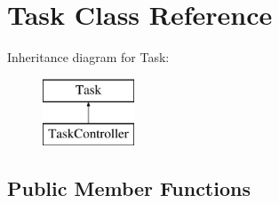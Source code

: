 \hypertarget{class_task}{\section{Task Class Reference}
\label{class_task}
}
Inheritance diagram for Task\-:\begin{figure}[H]
\begin{center}
\leavevmode
\includegraphics[height=2.000000cm]{class_task}
\end{center}
\end{figure}
\subsection*{Public Member Functions}
